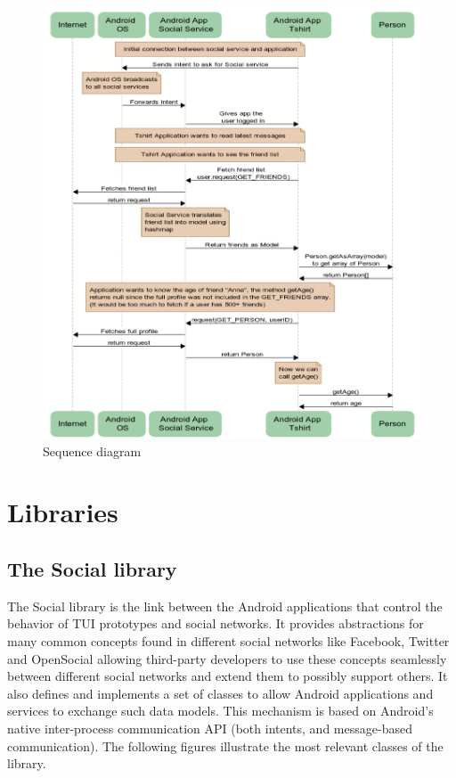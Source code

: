 \begin{figure}[h!]
	\centering \includegraphics[width=1.0\textwidth]{img/design-sequence.png}
	\caption{Sequence diagram}
	\label{fig:design-sequence}
\end{figure}


\section{Libraries}

\subsection{The Social library}
The Social library is the link between the Android applications that control the
behavior of TUI prototypes and social networks. It provides abstractions for
many common concepts found in different social networks like Facebook, Twitter
and OpenSocial allowing third-party developers to use these concepts seamlessly
between different social networks and extend them to possibly support others.
It also defines and implements a set of classes to allow Android applications
and services to exchange such data models. This mechanism is based on Android's
native inter-process communication API (both intents, and message-based \newline
communication). The following figures illustrate the most relevant classes
of the library.

